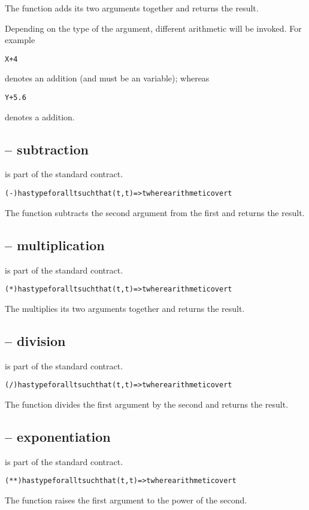 The \q{+} function adds its two arguments together and returns the result.

Depending on the type of the argument, different arithmetic will be invoked. For example
\begin{alltt}
X+4
\end{alltt}
denotes an  addition (and  must be an  variable); whereas
\begin{alltt}
Y+5.6
\end{alltt}
denotes a  addition.

\subsection{\q{-} -- subtraction}
\label{minusFunction}
\q{-} is part of the standard  contract.
\begin{alltt}
(-) has type for all t such that (t,t)=>t where arithmetic over t
\end{alltt}

The \q{-} function subtracts the second argument from the first and returns the result.

\subsection{\q{*} -- multiplication}
\label{timesFunction}
\q{*} is part of the standard  contract.
\begin{alltt}
(*) has type for all t such that (t,t)=>t where arithmetic over t
\end{alltt}
The \q{*} multiplies its two arguments together and returns the result.

\subsection{\q{/} -- division}
\label{divideFunction}
\q{/} is part of the standard  contract.
\begin{alltt}
(/) has type for all t such that (t,t)=>t where arithmetic over t
\end{alltt}
The \q{/} function divides the first argument by the second and returns the result.

\subsection{\q{**} -- exponentiation}
\label{powerFunction}
\q{**} is part of the standard  contract.
\begin{alltt}
(**) has type for all t such that (t,t)=>t where arithmetic over t
\end{alltt}
The \q{**} function raises the first argument to the power of the second.

